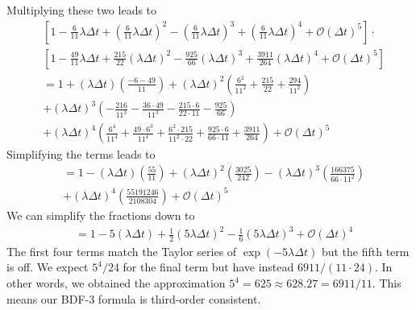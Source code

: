 \documentclass[10pt,a4paper]{article}
\begin{document}
Multiplying these two leads to
\begin{align*}
  &\left[1 - \frac{6}{11}\lambda \Delta t + \left(\frac{6}{11}\lambda \Delta t\right)^2 - \left(\frac{6}{11}\lambda \Delta t\right)^3 + \left(\frac{6}{11}\lambda \Delta t\right)^4 + \mathcal{O}(\Delta t)^5\right]\cdot \\
  &\left[1 - \frac{49}{11}\lambda \Delta t + \frac{215}{22}(\lambda \Delta t)^2 - \frac{925}{66}(\lambda \Delta t)^3 + \frac{3911}{264}(\lambda \Delta t)^4 + \mathcal{O}(\Delta t)^5\right] \\
  &= 1 + (\lambda \Delta t)\left(\frac{-6-49}{11}\right) + (\lambda \Delta t)^2\left(\frac{6^2}{11^2} + \frac{215}{22} + \frac{294}{11^2}\right) \\
  &+ (\lambda \Delta t)^3\left(-\frac{216}{11^3} - \frac{36\cdot 49}{11^3} - \frac{215\cdot 6}{22\cdot 11} - \frac{925}{66}\right) \\
  &+ (\lambda \Delta t)^4\left(\frac{6^4}{11^4} + \frac{49\cdot 6^3}{11^4} + \frac{6^2\cdot 215}{11^2\cdot 22}+\frac{925\cdot 6}{66\cdot 11} + \frac{3911}{264}\right) + \mathcal{O}(\Delta t)^5
\end{align*}
Simplifying the terms leads to
\begin{align*}
  &= 1 - (\lambda \Delta t)\left(\frac{55}{11}\right) + (\lambda \Delta t)^2\left(\frac{3025}{242} \right) - (\lambda \Delta t)^3\left(\frac{166375}{66\cdot 11^2} \right) \\
  &+ (\lambda \Delta t)^4\left( \frac{55191246}{2108304}\right) + \mathcal{O}(\Delta t)^5
\end{align*}
We can simplify the fractions down to
\begin{align*}
  &= 1 - 5(\lambda \Delta t) + \frac{1}{2}(5\lambda \Delta t)^2 - \frac{1}{6}(5 \lambda \Delta t)^3  + \mathcal{O}(\Delta t)^4
\end{align*}
The first four terms match the Taylor series of $\exp(-5\lambda \Delta t)$ but the fifth term is off. We expect $5^4/24$ for the final term but have instead $6911/(11\cdot 24).$ In other words, we obtained the approximation $5^4 = 625 \approx 628.27 = 6911/11.$
This means our BDF-3 formula is third-order consistent.
\end{document}

